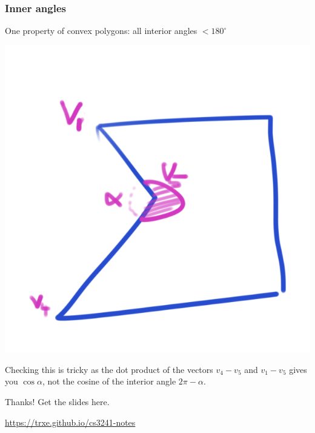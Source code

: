 \documentclass{beamer}
\begin{document}
\begin{frame}
    \frametitle{Inner angles}

    One property of convex polygons: all interior angles $<180^{\circ}$

    \vspace{1em}

    \begin{center}
        \includegraphics[scale=0.4]{dot-prod.png}
    \end{center}

    Checking this is tricky as the dot product of the vectors $v_4- v_5$ and $v_1 - v_5$ gives you $\cos\alpha$, 
    not the cosine of the interior angle $2\pi - \alpha$.

\end{frame}


\ThankYou
\begin{frame}
    Thanks! Get the slides here.\\
    \vspace{2em}
    \scalebox{3}{\faGithub}\par\bigskip
    \url{https://trxe.github.io/cs3241-notes}
\end{frame}
\end{document}
